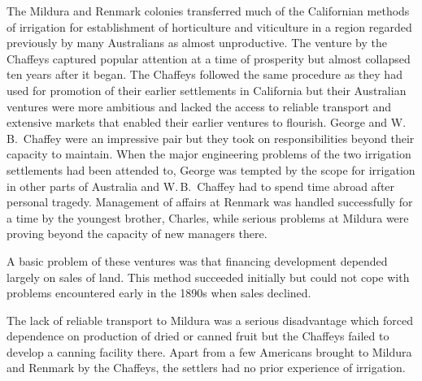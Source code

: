 \closure
The Mildura and Renmark colonies transferred much of the Californian
methods of irrigation for establishment of horticulture and
viticulture in a region regarded previously by many Australians as
almost unproductive.  The venture by the Chaffeys 
captured popular attention at a time of prosperity but almost
collapsed ten years after it began.  The Chaffeys followed the same
procedure as they had used for promotion of their earlier settlements
in California but their Australian ventures were more ambitious and
lacked the access to reliable transport and extensive markets that
enabled their earlier ventures to flourish.  George and W.\,B.~Chaffey
were an impressive pair but they took on responsibilities beyond their
capacity to maintain.  When the major engineering problems of the two
irrigation settlements had been attended to, George was tempted by the
scope for irrigation in other parts of Australia and W.\,B.~Chaffey
had to spend time abroad after personal tragedy.  Management of
affairs at Renmark was handled successfully for a time by the youngest
brother, Charles, while serious problems at Mildura were proving
beyond the capacity of new managers there.

A basic problem of these ventures was that financing development
depend\-ed largely on sales of land.  This method succeeded initially
but could not cope with problems encountered early in the 1890s when
sales declined.

The lack of reliable transport to Mildura was a serious disadvantage
which forced dependence on production of dried or canned fruit but the
Chaffeys failed to develop a canning facility there.  Apart from a few
Americans brought to Mildura and Renmark by the Chaffeys, the settlers
had no prior experience of irrigation.

